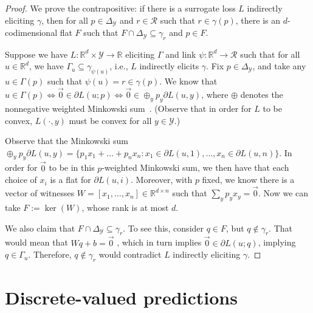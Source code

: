 \documentclass{article}
\newcommand{\reals}{\mathbb{R}}
\newcommand{\simplex}{\Delta_\Y}
\newcommand{\R}{\mathcal{R}}
\newcommand{\Y}{\mathcal{Y}}
\begin{document}
\begin{proof}[Proof]
	We prove the contrapositive: if there is a surrogate loss $L$ indirectly eliciting $\gamma$, then for all $p \in \simplex$ and $r \in \R$ such that $r \in \gamma(p)$, there is an $d$-codimensional flat $F$ such that $F \cap \simplex \subseteq \gamma_r$ and $p \in F$.
	
	Suppose we have $L:\reals^d \times \Y \to \reals$ eliciting $\Gamma$ and link $\psi : \reals^d \to \R$ such that for all $u \in \reals^d$, we have $\Gamma_u \subseteq \gamma_{\psi(u)}$, i.e., $L$ indirectly elicits $\gamma$.
	Fix $p \in \simplex$, and take any $u \in \Gamma(p)$ such that $\psi(u) = r \in \gamma(p)$.
	We know that $u \in \Gamma(p) \iff \vec 0 \in \partial L(u; p) \iff \vec 0 \in \oplus_y p_y \partial L(u,y)$, where $\oplus$ denotes the nonnegative weighted Minkowski sum~\cite[Theorem 4.1.1]{hiriart2012fundamentals}.  (Observe that in order for $L$ to be convex, $L(\cdot, y)$ must be convex for all $y \in \Y$.) 
	
	Observe that the Minkowski sum $\oplus_y p_y \partial L(u,y) = \{p_1 x_1 + \ldots + p_n x_n : x_1 \in \partial L(u,1), \ldots, x_n \in \partial L(u,n) \}$.
	In order for $\vec 0$ to be in this $p$-weighted Minkowski sum, we then have that each choice of $x_i$ is a flat for $\partial L(u, i)$.
	Moreover, with $p$ fixed, we know there is a vector of witnesses $W = [x_1, \ldots, x_n] \in \reals^{d\times n}$ such that $\sum_y p_y x_y = \vec 0$.
	Now we can take $F := \ker(W)$, whose rank is at most $d$.

	We also claim that $F \cap \simplex \subseteq \gamma_r$.
	To see this, consider $q \in F$, but $q \not \in \gamma_r$.
	That would mean that $Wq + b = \vec 0$ , which in turn implies $\vec 0 \in \partial L(u;q)$, implying $q \in \Gamma_u$.
	Therefore, $q \not \in \gamma_r$ would contradict $L$ indirectly eliciting $\gamma$.
\end{proof}


\section{Discrete-valued predictions}\label{sec:finite-calib}
\end{document}
